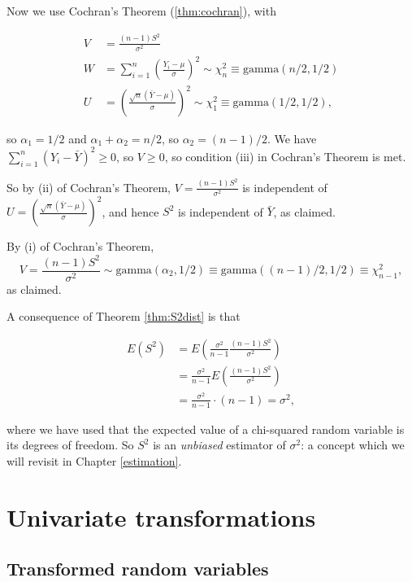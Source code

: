 \documentclass[]{book}
\theoremstyle{definition}
\theoremstyle{definition}
\theoremstyle{definition}
\theoremstyle{remark}
\begin{document}
Now we use Cochran's Theorem (\ref{thm:cochran}), with

\begin{align*}
V &= \frac{(n-1) S^2}{\sigma^2} \\
W &= \sum_{i=1}^n \left(\frac{Y_i - \mu}{\sigma}\right)^2 
\sim \chi^2_n \equiv \text{gamma}(n/2, 1/2) \\
U &= \left(\frac{\sqrt{n}(\bar Y - \mu)}{\sigma} \right)^2 
\sim \chi^2_1 \equiv \text{gamma}(1/2, 1/2),
\end{align*}

so \(\alpha_1 = 1/2\) and \(\alpha_1 + \alpha_2 = n/2\), so
\(\alpha_2 = (n-1)/2\). We have
\(\sum_{i=1}^n (Y_i - \bar Y)^2 \geq 0\), so \(V \geq 0\), so condition
(iii) in Cochran's Theorem is met.

So by (ii) of Cochran's Theorem, \(V = \frac{(n-1) S^2}{\sigma^2}\) is
independent of
\(U = \left(\frac{\sqrt{n}(\bar Y - \mu)}{\sigma} \right)^2\), and hence
\(S^2\) is independent of \(\bar Y\), as claimed.

By (i) of Cochran's Theorem, \[V = \frac{(n-1) S^2}{\sigma^2} 
\sim \text{gamma}(\alpha_2, 1/2)
\equiv \text{gamma}((n-1)/2, 1/2) \equiv \chi^2_{n-1},\] as claimed.

A consequence of Theorem \ref{thm:S2dist} is that

\begin{align*}
E(S^2) &= E\left(\frac{\sigma^2}{n-1} \frac{(n-1) S^2}{\sigma^2} \right) \\
  &= \frac{\sigma^2}{n-1} E\left(\frac{(n-1) S^2}{\sigma^2} \right) \\
  &=  \frac{\sigma^2}{n-1} \cdot (n - 1) = \sigma^2,
  \end{align*}

where we have used that the expected value of a chi-squared random
variable is its degrees of freedom. So \(S^2\) is an \emph{unbiased}
estimator of \(\sigma^2\): a concept which we will revisit in Chapter
\ref{estimation}.

\chapter{Univariate transformations}\label{unitransform}

\section{Transformed random
variables}\label{transformed-random-variables}
\end{document}
